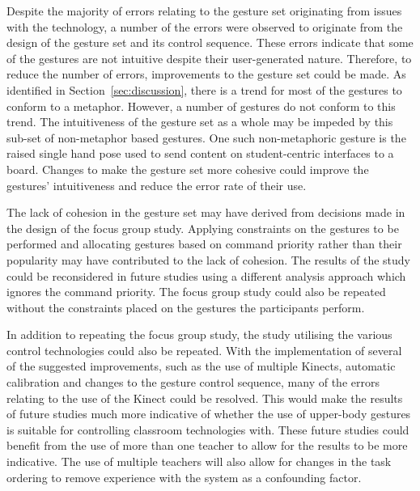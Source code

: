 \documentclass[manuscript, review, screen]{acmart}
\begin{document}
Despite the majority of errors relating to the gesture set originating from issues with the technology, a number of the errors were observed to originate from the design of the gesture set and its control sequence.
These errors indicate that some of the gestures are not intuitive despite their user-generated nature.
Therefore, to reduce the number of errors, improvements to the gesture set could be made.
As identified in Section~\ref{sec:discussion}, there is a trend for most of the gestures to conform to a metaphor.
However, a number of gestures do not conform to this trend.
The intuitiveness of the gesture set as a whole may be impeded by this sub-set of non-metaphor based gestures.
One such non-metaphoric gesture is the raised single hand pose used to send content on student-centric interfaces to a board.
Changes to make the gesture set more cohesive could improve the gestures' intuitiveness and reduce the error rate of their use.

The lack of cohesion in the gesture set may have derived from decisions made in the design of the focus group study.
Applying constraints on the gestures to be performed and allocating gestures based on command priority rather than their popularity may have contributed to the lack of cohesion.
The results of the study could be reconsidered in future studies using a different analysis approach which ignores the command priority.
The focus group study could also be repeated without the constraints placed on the gestures the participants perform.

In addition to repeating the focus group study, the study utilising the various control technologies could also be repeated.
With the implementation of several of the suggested improvements, such as the use of multiple Kinects, automatic calibration and changes to the gesture control sequence, many of the errors relating to the use of the Kinect could be resolved.
This would make the results of future studies much more indicative of whether the use of upper-body gestures is suitable for controlling classroom technologies with.
These future studies could benefit from the use of more than one teacher to allow for the results to be more indicative.
The use of multiple teachers will also allow for changes in the task ordering to remove experience with the system as a confounding factor.
\end{document}
